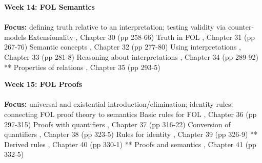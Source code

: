 \documentclass{article}
\begin{document}
\begin{outline}[enumerate]
\1 \textbf{Week 14: FOL Semantics}
\\
\\
\textbf{Focus:}
defining truth relative to an interpretation;
testing validity via counter-models
\2 Extensionality \3 \cite{Mag25},  Chapter 30 (pp 258-66)
\2 Truth in FOL \3 \cite{Mag25},  Chapter 31 (pp 267-76)
\2 Semantic concepts \3 \cite{Mag25},  Chapter 32 (pp 277-80)
\2 Using interpretations \3 \cite{Mag25},  Chapter 33 (pp 281-8)
\2 Reasoning about interpretations \3 \cite{Mag25},  Chapter 34 (pp 289-92)
\2 ** Properties of relations \3 \cite{Mag25},  Chapter 35 (pp 293-5)

\1 \textbf{Week 15: FOL Proofs}
\\
\\
\textbf{Focus:}
universal and existential introduction/elimination;
identity rules;
connecting FOL proof theory to semantics
\2 Basic rules for FOL \3 \cite{Mag25},  Chapter 36 (pp 297-315)
\2 Proofs with quantifiers \3 \cite{Mag25},  Chapter 37 (pp 316-22)
\2 Conversion of quantifiers \3 \cite{Mag25},  Chapter 38 (pp 323-5)
\2 Rules for identity \3 \cite{Mag25},  Chapter 39 (pp 326-9)
\2 ** Derived rules \3 \cite{Mag25},  Chapter 40 (pp 330-1)
\2 ** Proofs and semantics \3 \cite{Mag25},  Chapter 41 (pp 332-5)

\end{outline}

\printbibliography
\end{document}
